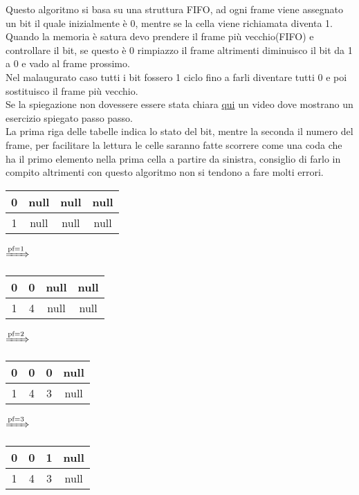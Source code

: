 \documentclass{article}
\begin{document}
\begin{enumerate}
         Questo algoritmo si basa su una struttura FIFO, ad ogni frame viene assegnato un bit il quale inizialmente è 0, mentre se la cella viene richiamata diventa 1.\\
         Quando la memoria è satura devo prendere il frame più vecchio(FIFO) e controllare il bit, se questo è 0 rimpiazzo il frame altrimenti diminuisco il bit da 1 a 0 e vado al frame prossimo.\\
         Nel malaugurato caso tutti i bit fossero 1 ciclo fino a farli diventare tutti 0 e poi sostituisco il frame più vecchio.\\
         Se la spiegazione non dovessere essere stata chiara \href{https://www.youtube.com/watch?v=P1icI9X3sR4}{qui} un video dove mostrano un esercizio spiegato passo passo.\\
         La prima riga delle tabelle indica lo stato del bit, mentre la seconda il numero del frame, per facilitare la lettura le celle saranno fatte scorrere come una coda che ha il primo elemento nella prima cella a partire da sinistra, consiglio di farlo in compito altrimenti con questo algoritmo non si tendono a fare molti errori.\\
         \begin{tabular}{|c|c|c|c|}
            \hline
            0 & null & null & null\\
            \hline
            1 & null & null & null\\
            \hline
         \end{tabular}
         $\xRightarrow{\text{pf}=1}$
         \begin{tabular}{|c|c|c|c|}
         \hline
            0 & 0 & null & null\\
            \hline
            1 & 4 & null & null\\
            \hline
         \end{tabular}
         $\xRightarrow{\text{pf}=2}$
         \begin{tabular}{|c|c|c|c|}
         \hline
            0 & 0 & 0 & null\\
            \hline
            1 & 4 & 3 & null\\
            \hline
         \end{tabular}
         $\xRightarrow{\text{pf}=3}$
         \begin{tabular}{|c|c|c|c|}
         \hline
         0 & 0 & 1 & null\\
         \hline
         1 & 4 & 3 & null\\
         \hline

\end{tabular}
\end{enumerate}
\end{document}
